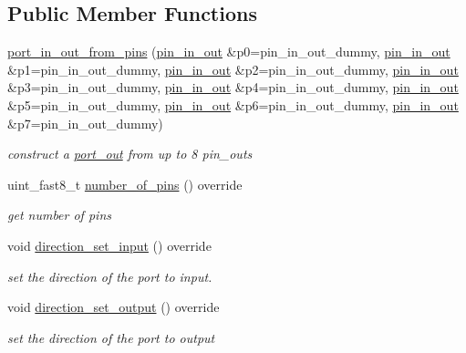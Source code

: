 \subsection*{Public Member Functions}
\begin{DoxyCompactItemize}
\item 
\hyperlink{classhwlib_1_1port__in__out__from__pins_a69cc74af76d03ff9008e7f130b7065ee}{port\+\_\+in\+\_\+out\+\_\+from\+\_\+pins} (\hyperlink{classhwlib_1_1pin__in__out}{pin\+\_\+in\+\_\+out} \&p0=pin\+\_\+in\+\_\+out\+\_\+dummy, \hyperlink{classhwlib_1_1pin__in__out}{pin\+\_\+in\+\_\+out} \&p1=pin\+\_\+in\+\_\+out\+\_\+dummy, \hyperlink{classhwlib_1_1pin__in__out}{pin\+\_\+in\+\_\+out} \&p2=pin\+\_\+in\+\_\+out\+\_\+dummy, \hyperlink{classhwlib_1_1pin__in__out}{pin\+\_\+in\+\_\+out} \&p3=pin\+\_\+in\+\_\+out\+\_\+dummy, \hyperlink{classhwlib_1_1pin__in__out}{pin\+\_\+in\+\_\+out} \&p4=pin\+\_\+in\+\_\+out\+\_\+dummy, \hyperlink{classhwlib_1_1pin__in__out}{pin\+\_\+in\+\_\+out} \&p5=pin\+\_\+in\+\_\+out\+\_\+dummy, \hyperlink{classhwlib_1_1pin__in__out}{pin\+\_\+in\+\_\+out} \&p6=pin\+\_\+in\+\_\+out\+\_\+dummy, \hyperlink{classhwlib_1_1pin__in__out}{pin\+\_\+in\+\_\+out} \&p7=pin\+\_\+in\+\_\+out\+\_\+dummy)
\begin{DoxyCompactList}\small\item\em construct a \hyperlink{classhwlib_1_1port__out}{port\+\_\+out} from up to 8 pin\+\_\+outs \end{DoxyCompactList}\item 
uint\+\_\+fast8\+\_\+t \hyperlink{classhwlib_1_1port__in__out__from__pins_a7e5e5767a4d104461939e0b7c5dd8482}{number\+\_\+of\+\_\+pins} () override
\begin{DoxyCompactList}\small\item\em get number of pins \end{DoxyCompactList}\item 
void \hyperlink{classhwlib_1_1port__in__out__from__pins_a63dda73defa40b64d61caff9e3209c95}{direction\+\_\+set\+\_\+input} () override
\begin{DoxyCompactList}\small\item\em set the direction of the port to input. \end{DoxyCompactList}\item 
void \hyperlink{classhwlib_1_1port__in__out__from__pins_a82d271d0bd20b627c5ebf250ad3f844e}{direction\+\_\+set\+\_\+output} () override
\begin{DoxyCompactList}\small\item\em set the direction of the port to output \end{DoxyCompactList}\item 

\end{DoxyCompactItemize}

